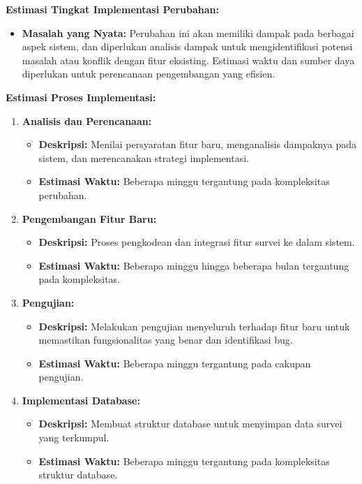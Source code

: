 \documentclass[12pt]{article}
\begin{document}
\textbf{Estimasi Tingkat Implementasi Perubahan:}
\begin{itemize}
  \item \textbf{Masalah yang Nyata:} Perubahan ini akan memiliki dampak pada berbagai aspek sistem, dan diperlukan analisis dampak untuk mengidentifikasi potensi masalah atau konflik dengan fitur eksisting. Estimasi waktu dan sumber daya diperlukan untuk perencanaan pengembangan yang efisien.
\end{itemize}
\textbf{Estimasi Proses Implementasi:}

\begin{enumerate}
  \item \textbf{Analisis dan Perencanaan:}
  \begin{itemize}
    \item \textbf{Deskripsi:} Menilai persyaratan fitur baru, menganalisis dampaknya pada sistem, dan merencanakan strategi implementasi.
    \item \textbf{Estimasi Waktu:} Beberapa minggu tergantung pada kompleksitas perubahan.
  \end{itemize}

  \item \textbf{Pengembangan Fitur Baru:}
  \begin{itemize}
    \item \textbf{Deskripsi:} Proses pengkodean dan integrasi fitur survei ke dalam sistem.
    \item \textbf{Estimasi Waktu:} Beberapa minggu hingga beberapa bulan tergantung pada kompleksitas.
  \end{itemize}

  \item \textbf{Pengujian:}
  \begin{itemize}
    \item \textbf{Deskripsi:} Melakukan pengujian menyeluruh terhadap fitur baru untuk memastikan fungsionalitas yang benar dan identifikasi bug.
    \item \textbf{Estimasi Waktu:} Beberapa minggu tergantung pada cakupan pengujian.
  \end{itemize}

  \item \textbf{Implementasi Database:}
  \begin{itemize}
    \item \textbf{Deskripsi:} Membuat struktur database untuk menyimpan data survei yang terkumpul.
    \item \textbf{Estimasi Waktu:} Beberapa minggu tergantung pada kompleksitas struktur database.
  \end{itemize}


\end{enumerate}
\end{document}
